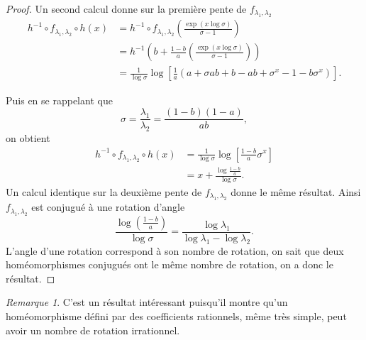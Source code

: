 \documentclass[12pt]{article}
\theoremstyle{remark}
\newtheorem*{remark}{Remarque}
\begin{document}
\begin{proof}
        Un second calcul donne sur la première pente de $f_{\lambda_1, \lambda_2}$ 
        \begin{align*}
                h^{-1}\circ f_{\lambda_1, \lambda_2} \circ h (x) &= h^{-1} \circ f_{\lambda_1, \lambda_2} (\frac{\exp(x\log\sigma)}{\sigma-1})\\ 
                                                                 &= h^{-1}(b+\frac{1-b}{a}(\frac{\exp(x\log\sigma)}{\sigma-1})) \\
                                                                 &= \frac{1}{\log\sigma}\log[\frac{1}{a}(a+\sigma ab +b - ab + \sigma^{x} - 1-b\sigma^{x})]
        .\end{align*}

        Puis en se rappelant que \[
                \sigma = \frac{\lambda_1}{\lambda_2} = \frac{(1-b)(1-a)}{ab}
        ,\] on obtient
        \begin{align*}
                h^{-1}\circ f_{\lambda_1, \lambda_2} \circ h (x) &= \frac{1}{\log\sigma}\log[\frac{1-b}{a}\sigma^{x}] \\
                                                                 &= x + \frac{\log\frac{1-b}{a}}{\log\sigma}
        .\end{align*}
        Un calcul identique sur la deuxième pente de $f_{\lambda_1, \lambda_2}$ donne le même résultat. Ainsi $f_{\lambda_1, \lambda_2}$ est conjugué à une rotation d'angle \[
        \frac{\log(\frac{1-b}{a})}{\log\sigma} = \frac{\log\lambda_1} {\log\lambda_1 -\log\lambda_2}
        .\] L'angle d'une rotation correspond à son nombre de rotation, on sait que deux homéomorphismes conjugués ont le même nombre de rotation, on a donc le résultat.
\end{proof}

        \begin{remark}
                C'est un résultat intéressant puisqu'il montre qu'un homéomorphisme défini par des coefficients rationnels, même très simple, peut avoir un nombre de rotation irrationnel.
        \end{remark}
\end{document}
